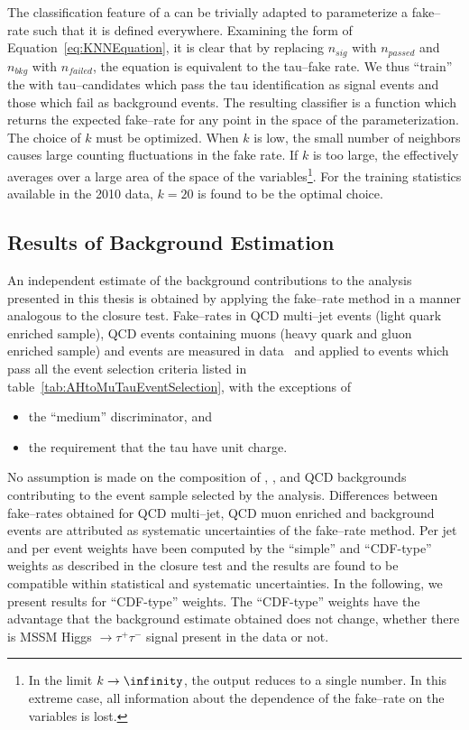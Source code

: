 The classification feature of a \kNN can be trivially adapted to parameterize a
fake--rate such that it is defined everywhere.  Examining the form of
Equation~\ref{eq:KNNEquation}, it is clear that by replacing $n_{sig}$ with
$n_{passed}$ and $n_{bkg}$ with $n_{failed}$, the equation is equivalent to the
tau--fake rate.  We thus ``train'' the \kNN with tau--candidates which pass the
tau identification as signal events and those which fail as background events.
The resulting classifier is a function which returns the expected fake--rate for
any point in the space of the parameterization.  The choice of $k$ must be
optimized.  When $k$ is low, the small number of neighbors causes large counting
fluctuations in the fake rate.  If $k$ is too large, the \kNN effectively
averages over a large area of the space of the variables\footnote{In the limit
$k\to\infinity$, the \kNN output reduces to a single number.  In this extreme case,
all information about the dependence of the fake--rate on the variables is
lost.}.  For the training statistics available in the 2010 data, $k=20$ is found
to be the optimal choice.

\subsection{Results of Background Estimation}
%
An independent estimate of the background contributions to the analysis
presented in this thesis is obtained by applying the fake--rate method in a
manner analogous to the closure test.  Fake--rates in QCD multi--jet events
(light quark enriched sample), QCD events containing muons (heavy quark and
gluon enriched sample) and \WpJets events are measured in
data~\cite{CMS-PAS-PFT-10-004,CMS-PAS-TAU-11-001} and applied to events which
pass all the event selection criteria listed in
table~\ref{tab:AHtoMuTauEventSelection}, with the exceptions of 
\begin{itemize}
  \item the ``medium'' \hpsTanc discriminator, and
  \item the requirement that the tau have unit charge.
\end{itemize}

No assumption is made on the composition of \ZMM, \WpJets,
\ttbarpJets and QCD backgrounds contributing to the event sample selected
by the analysis.  Differences between fake--rates obtained for QCD multi--jet,
QCD muon enriched and \WpJets background events are attributed as systematic
uncertainties of the fake--rate method.  Per jet and per event weights have been
computed by the ``simple'' and ``CDF-type'' weights as described
in the closure test and the results are found to be compatible within
statistical and systematic uncertainties.  In the following, we present results
for ``CDF-type'' weights.  The ``CDF-type'' weights have the advantage that the
background estimate obtained does not change, whether there is MSSM Higgs $\to
\tau^{+} \tau^{-}$ signal present in the data or not.

